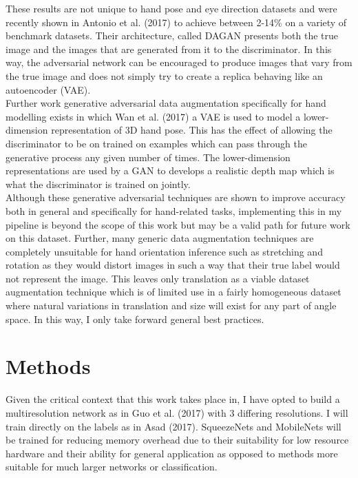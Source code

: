 \documentclass{article}
\begin{document}
These results are not unique to hand pose and eye direction datasets and were recently shown in Antonio et al. (2017) to achieve between 2-14\% on a variety of benchmark datasets. Their architecture, called DAGAN presents both the true image and the images that are generated from it to the discriminator. In this way, the adversarial network can be encouraged to produce images that vary from the true image and does not simply try to create a replica behaving like an autoencoder (VAE).\\

Further work generative adversarial data augmentation specifically for hand modelling exists in which Wan et al. (2017) a VAE is used to model a lower-dimension representation of 3D hand pose. This has the effect of allowing the discriminator to be on trained on examples which can pass through the generative process any given number of times. The lower-dimension representations are used by a GAN to develops a realistic depth map which is what the discriminator is trained on jointly. \\

Although these generative adversarial techniques are shown to improve accuracy both in general and specifically for hand-related tasks, implementing this in my pipeline is beyond the scope of this work but may be a valid path for future work on this dataset. Further, many generic data augmentation techniques are completely unsuitable for hand orientation inference such as stretching and rotation as they would distort images in such a way that their true label would not represent the image. This leaves only translation as a viable dataset augmentation technique which is of limited use in a fairly homogeneous dataset where natural variations in translation and size will exist for any part of angle space. In this way, I only take forward general best practices.

\section{Methods}

Given the critical context that this work takes place in, I have opted to build a multiresolution network as in Guo et al. (2017) with 3 differing resolutions. I will train directly on the labels as in Asad (2017). SqueezeNets and MobileNets will be trained for reducing memory overhead due to their suitability for low resource hardware and their ability for general application as opposed to methods more suitable for much larger networks or classification. \\
\end{document}
